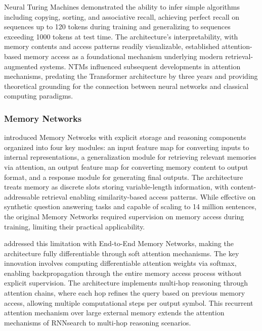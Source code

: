 \documentclass[11pt,letterpaper]{article}
\begin{document}
Neural Turing Machines demonstrated the ability to infer simple algorithms including copying, sorting, and associative recall, achieving perfect recall on sequences up to 120 tokens during training and generalizing to sequences exceeding 1000 tokens at test time. The architecture's interpretability, with memory contents and access patterns readily visualizable, established attention-based memory access as a foundational mechanism underlying modern retrieval-augmented systems. NTMs influenced subsequent developments in attention mechanisms, predating the Transformer architecture by three years and providing theoretical grounding for the connection between neural networks and classical computing paradigms.

\subsubsection{Memory Networks}

\cite{weston2015memory} introduced Memory Networks with explicit storage and reasoning components organized into four key modules: an input feature map for converting inputs to internal representations, a generalization module for retrieving relevant memories via attention, an output feature map for converting memory content to output format, and a response module for generating final outputs. The architecture treats memory as discrete slots storing variable-length information, with content-addressable retrieval enabling similarity-based access patterns. While effective on synthetic question answering tasks and capable of scaling to 14 million sentences, the original Memory Networks required supervision on memory access during training, limiting their practical applicability.

\cite{sukhbaatar2015end} addressed this limitation with End-to-End Memory Networks, making the architecture fully differentiable through soft attention mechanisms. The key innovation involves computing differentiable attention weights via softmax, enabling backpropagation through the entire memory access process without explicit supervision. The architecture implements multi-hop reasoning through attention chains, where each hop refines the query based on previous memory access, allowing multiple computational steps per output symbol. This recurrent attention mechanism over large external memory extends the attention mechanisms of RNNsearch to multi-hop reasoning scenarios.
\end{document}
